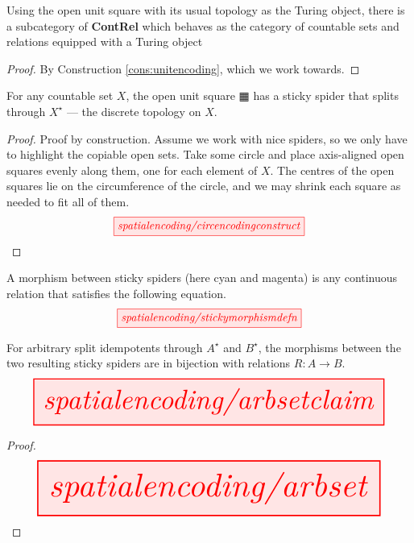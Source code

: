 \begin{proposition}
Using the open unit square with its usual topology as the Turing object, there is a subcategory of \textbf{ContRel} which behaves as the category of countable sets and relations equipped with a Turing object
\begin{proof}
By Construction \ref{cons:unitencoding}, which we work towards.
\end{proof}
\end{proposition}

\begin{lemma}
For any countable set $X$, the open unit square $\squarehvfill$ has a sticky spider that splits through $X^\star$ --- the discrete topology on $X$.
\begin{proof}
Proof by construction. Assume we work with nice spiders, so we only have to highlight the copiable open sets. Take some circle and place axis-aligned open squares evenly along them, one for each element of $X$. The centres of the open squares lie on the circumference of the circle, and we may shrink each square as needed to fit all of them.
\[\scalebox{1}{\tikzfig{spatialencoding/circencodingconstruct}}\]
\end{proof}
\end{lemma}

\begin{defn}
A morphism between sticky spiders (here cyan and magenta) is any continuous relation that satisfies the following equation.
\[\scalebox{1}{\tikzfig{spatialencoding/stickymorphismdefn}}\]
\end{defn}

\begin{lemma}
For arbitrary split idempotents through $A^\star$ and $B^\star$, the morphisms between the two resulting sticky spiders are in bijection with relations $R: A \rightarrow B$.
\[\resizebox{\textwidth}{!}{\tikzfig{spatialencoding/arbsetclaim}}\]
\begin{proof}
\[\resizebox{\textwidth}{!}{\tikzfig{spatialencoding/arbset}}\]
\end{proof}
\end{lemma}

